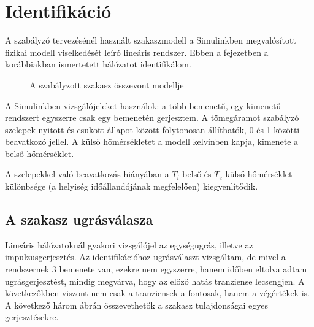 \chapter{Identifikáció}\label{chap:ident}


A szabályzó tervezésénél használt szakaszmodell a Simulinkben megvalósított fizikai modell viselkedését leíró lineáris rendszer. Ebben a fejezetben a korábbiakban ismertetett hálózatot identifikálom.
\begin{figure}[h]
	\centering
	
	\caption{A szabályzott szakasz összevont modellje}
	\label{tikz:simulation}
\end{figure}

A Simulinkben vizsgálójeleket használok: a több bemenetű, egy kimenetű rendszert egyszerre csak egy bemenetén gerjesztem. A tömegáramot szabályzó szelepek nyitott és csukott állapot között folytonosan állíthatók, 0 és 1 közötti beavatkozó jellel. A külső hőmérsékletet a modell kelvinben kapja, kimenete a belső hőmérséklet.

A szelepekkel való beavatkozás hiányában a $T_i$ belső és $T_e$ külső hőmérséklet különbsége (a helyiség időállandójának megfelelően) kiegyenlítődik.


\section{A szakasz ugrásválasza}

Lineáris hálózatoknál gyakori vizsgálójel az egységugrás, illetve az impulzusgerjesztés. Az identifikációhoz ugrásválaszt vizsgáltam, de mivel a rendszernek 3 bemenete van, ezekre nem egyszerre, hanem időben eltolva adtam ugrásgerjesztést, mindig megvárva, hogy az előző hatás tranziense lecsengjen. A következőkben viszont nem csak a tranziensek a fontosak, hanem a végértékek is. A következő három ábrán összevethetők a szakasz tulajdonságai egyes gerjesztésekre.

